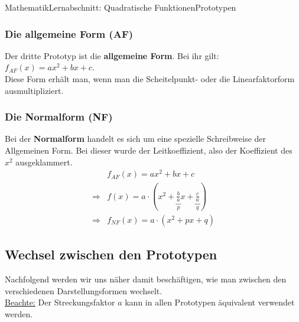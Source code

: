 \documentclass[11pt,twocolumn,oneside,openany,headings=optiontotoc,11pt,numbers=noenddot]{article}
\begin{document}
\begin{worksheet}{Mathematik}{Lernabschnitt: Quadratische Funktionen}{Prototypen}
		\subsubsection*{Die allgemeine Form (AF)}
		Der dritte Prototyp ist die \textbf{allgemeine Form}. Bei ihr gilt: \(f_{AF}(x) = ax^2 +bx+c\).\\
		Diese Form erhält man, wenn man die Scheitelpunkt- oder die Linearfaktorform ausmultipliziert.
		\subsubsection*{Die Normalform (NF)}
		Bei der \textbf{Normalform} handelt es sich um eine spezielle Schreibweise der Allgemeinen Form. Bei dieser wurde der Leitkoeffizient, also der Koeffizient des \(x^2\) ausgeklammert.
		\begin{align*}
			& f_{AF}(x) = ax^2 +bx + c\\
			\Rightarrow & f(x) = a\cdot(x^2 + \underbrace{\frac{b}{a}}_{p}x + \underbrace{\frac{c}{a}}_{q})\\
			\Rightarrow & f_{NF}(x) = a\cdot(x^2 + px + q)
		\end{align*}
		\subsection{Wechsel zwischen den Prototypen}
		Nachfolgend werden wir uns näher damit beschäftigen, wie man zwischen den verschiedenen Darstellungsformen wechselt.\\
		\underline{Beachte:} Der Streckungsfaktor \(a\) kann in allen Prototypen äquivalent verwendet werden.

\end{worksheet}
\end{document}
